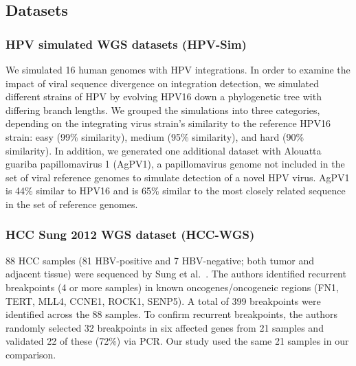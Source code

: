 \documentclass[12pt]{article}
\begin{document}

\subsection{Datasets}

\subsubsection{HPV simulated WGS datasets (HPV-Sim)}
We simulated 16 human genomes with HPV integrations.  In order to examine the impact of viral sequence divergence on integration detection, we simulated different strains of HPV by evolving HPV16 down a phylogenetic tree with differing branch lengths.  We grouped the simulations into three categories, depending on the integrating virus strain's similarity to the reference HPV16 strain: easy (99\% similarity), medium (95\% similarity), and hard (90\% similarity).  In addition, we generated one additional dataset with Alouatta guariba papillomavirus 1 (AgPV1), a papillomavirus genome not included in the set of viral reference genomes to simulate detection of a novel HPV virus.  AgPV1 is 44\% similar to HPV16 and is 65\% similar to the most closely related sequence in the set of reference genomes.


\subsubsection{HCC Sung 2012 WGS dataset (HCC-WGS)}
88 HCC samples (81 HBV-positive and 7 HBV-negative; both tumor and adjacent tissue) were sequenced by Sung et al.~\cite{Sung2012}.  The authors identified recurrent breakpoints (4 or more samples) in known oncogenes/oncogeneic regions (FN1, TERT, MLL4, CCNE1, ROCK1, SENP5).  A total of 399 breakpoints were identified across the 88 samples.  To confirm recurrent breakpoints, the authors randomly selected 32 breakpoints in six affected genes from 21 samples and validated 22 of these (72\%) via PCR.  Our study used the same 21 samples in our comparison.
\end{document}
